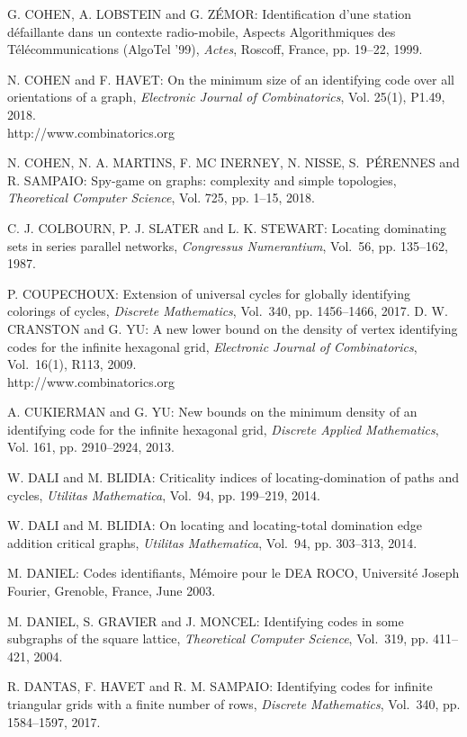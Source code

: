 \begin{thebibliography}{999}
G. COHEN, A. LOBSTEIN and G. Z\'EMOR: Identification d'une station d\'efaillante dans un contexte radio-mobile, Aspects Algorithmiques des T\'el\'ecommunications (AlgoTel '99), {\it Actes}, Roscoff, France, pp. 19--22, 1999.

N. COHEN and F. HAVET: On the minimum size of an identifying code over all orientations of a graph, {\it Electronic Journal of Combinatorics}, Vol. 25(1), P1.49, 2018.\\
http://www.combinatorics.org

N. COHEN, N. A. MARTINS, F. MC INERNEY, N. NISSE, S.~P\'E\-RENNES and R. SAMPAIO: Spy-game on graphs: complexity and simple topologies, {\it Theoretical Computer Science}, Vol. 725, pp. 1--15, 2018.

C. J. COLBOURN, P. J. SLATER and L. K. STEWART: Locating dominating sets in series parallel networks, {\it Congressus Numerantium}, Vol.~56, pp. 135--162, 1987.

P. COUPECHOUX: Extension of universal cycles for globally identifying colorings of cycles, {\it Discrete Mathematics}, Vol.~340, pp. 1456--1466, 2017.
D. W. CRANSTON and G. YU: A new lower bound on the density of vertex identifying codes for the infinite hexagonal grid, {\it Electronic Journal of Combinatorics}, Vol.~16(1), R113, 2009.\\
http://www.combinatorics.org

A. CUKIERMAN and G. YU: New bounds on the minimum density of an identifying code for the infinite hexagonal grid, {\it Discrete Applied Mathematics}, Vol. 161, pp. 2910--2924, 2013.

W. DALI and M. BLIDIA: Criticality indices of locating-domination of paths and cycles, {\it Utilitas Mathematica}, Vol.~94, pp. 199--219, 2014.

W. DALI and M. BLIDIA: On locating and locating-total domination edge addition critical graphs, {\it Utilitas Mathematica}, Vol.~94, pp. 303--313, 2014.

M. DANIEL: Codes identifiants, M\'emoire pour le DEA ROCO, Universit\'e Joseph Fourier, Grenoble, France, June 2003.

M. DANIEL, S. GRAVIER and J. MONCEL: Identifying codes in some subgraphs of the square lattice, {\it Theoretical Computer Science}, Vol.~319, pp. 411--421, 2004.

R. DANTAS, F. HAVET and R. M. SAMPAIO: Identifying codes for infinite triangular grids with a finite number of rows, {\it Discrete Mathematics}, Vol.~340, pp. 1584--1597, 2017.


\end{thebibliography}
